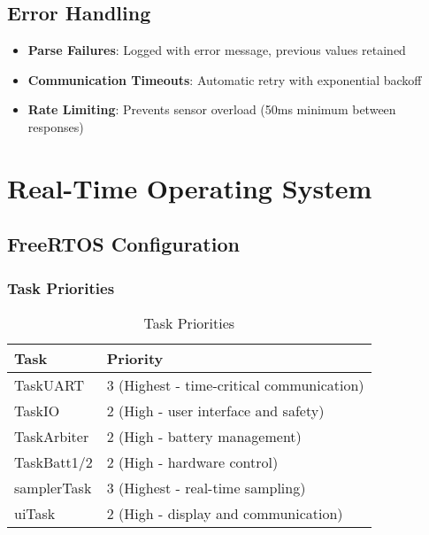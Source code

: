 \documentclass[11pt,a4paper]{article}
\begin{document}
\subsection{Error Handling}

\begin{itemize}
    \item \textbf{Parse Failures}: Logged with error message, previous values retained
    \item \textbf{Communication Timeouts}: Automatic retry with exponential backoff
    \item \textbf{Rate Limiting}: Prevents sensor overload (50ms minimum between responses)
\end{itemize}

\section{Real-Time Operating System}

\subsection{FreeRTOS Configuration}

\subsubsection{Task Priorities}
\begin{table}[H]
\centering
\begin{tabular}{@{}ll@{}}
\toprule
Task & Priority \\ \midrule
TaskUART & 3 (Highest - time-critical communication) \\
TaskIO & 2 (High - user interface and safety) \\
TaskArbiter & 2 (High - battery management) \\
TaskBatt1/2 & 2 (High - hardware control) \\
samplerTask & 3 (Highest - real-time sampling) \\
uiTask & 2 (High - display and communication) \\ \bottomrule
\end{tabular}
\caption{Task Priorities}
\end{table}
\end{document}
